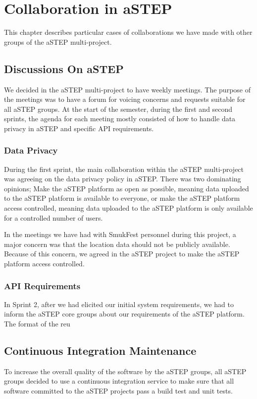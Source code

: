 \chapter{Collaboration in aSTEP}\label{ch:collab}

This chapter describes particular cases of collaborations we have made with other groups of the aSTEP multi-project.

\section{Discussions On aSTEP}
We decided in the aSTEP multi-project to have weekly meetings. The purpose of the meetings was to have a forum for voicing concerns and requests suitable for all aSTEP groups. At the start of the semester, during the first and second sprints, the agenda for each meeting mostly consisted of how to handle data privacy in aSTEP and specific API requirements.

\subsection{Data Privacy}

During the first sprint, the main collaboration within the aSTEP multi-project was agreeing on the data privacy policy in aSTEP. There was two dominating opinions; Make the aSTEP platform as open as possible, meaning data uploaded to the aSTEP platform is available to everyone, or make the aSTEP platform access controlled, meaning data uploaded to the aSTEP platform is only available for a controlled number of users.

In the meetings we have had with SmukFest personnel during this project, a major concern was that the location data should not be publicly available. Because of this concern, we agreed in the aSTEP project to make the aSTEP platform access controlled.

\subsection{API Requirements}
In Sprint 2, after we had elicited our initial system requirements, we had to inform the aSTEP core groups about our requirements of the aSTEP platform. The format of the reu




\section{Continuous Integration Maintenance}
To increase the overall quality of the software by the aSTEP groups, all aSTEP groups decided to use a continuous integration service to make sure that all software committed to the aSTEP projects pass a build test and unit tests.


